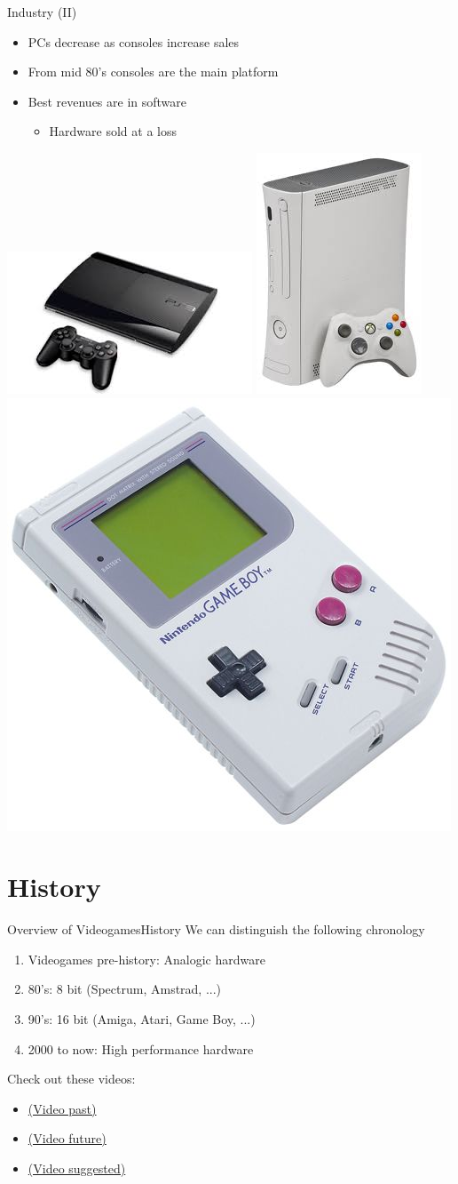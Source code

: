 \documentclass[10pt,compress]{beamer} %
\begin{document}
\begin{frame}{Industry (II)}
	\begin{itemize}
		\item PCs decrease as consoles increase sales
		\item From mid 80's consoles are the main platform
		\item Best revenues are in software
		\begin{itemize}
		\item Hardware sold at a loss
		\end{itemize}
	\end{itemize}

	\begin{center}
	\includegraphics[width=0.3\linewidth]{figs/ps3.jpeg}
	\includegraphics[width=0.15\linewidth]{figs/xbox.jpeg}
	\includegraphics[width=0.2\linewidth]{figs/gameboy}
	\end{center}
\end{frame}

\section{History}
\begin{frame}{Overview of Videogames}{History}
	We can distinguish the following chronology
	   	\begin{enumerate}
		\item Videogames pre-history: Analogic hardware
		\item 80's: 8 bit (Spectrum, Amstrad, ...)
		\item 90's: 16 bit (Amiga, Atari, Game Boy, ...)
		\item 2000 to now: High performance hardware
	  	\end{enumerate}

	Check out these videos:
    	\begin{itemize}
		\item \href{http://www.youtube.com/watch?v=vRvclH7tRvk}{(Video past)}
		\item \href{http://www.youtube.com/watch?v=9t3TCecduQc}{(Video future)}
		\item \href{http://www.rtve.es/noticias/historia-videoconsolas/}{(Video suggested)}
    	\end{itemize}
\end{frame}
\end{document}
